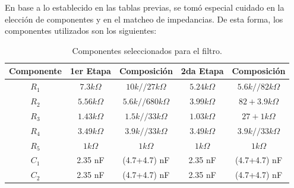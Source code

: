 En base a lo establecido en las tablas previas, se tomó especial cuidado en la elección de componentes y en el matcheo de impedancias. De esta forma, los componentes utilizados son los siguientes:
\begin{table}[H]
\centering
\begin{tabular}{ccccc}
\hline
\multicolumn{1}{c}{Componente} & \multicolumn{1}{c}{1er Etapa} & \multicolumn{1}{c}{Composición} & 2da Etapa      & Composición           \\ \hline
$R_1$                          & $7.3 k\Omega$                 & $10k // 27k  \Omega$            & $5.24 k\Omega$ & $5.6k // 82k  \Omega$ \\
$R_2$                          & $5.56 k\Omega$                & $5.6k // 680k  \Omega$          & $3.99 k\Omega$ & $82 + 3.9k  \Omega$   \\
$R_3$                          & $1.43 k\Omega$                & $1.5 k // 33k  \Omega$          & $1.03k\Omega$  & $27 + 1k  \Omega$     \\
$R_4$                          & $3.49 k\Omega$                & $3.9k // 33k  \Omega$           & $3.49 k\Omega$ & $3.9k // 33k  \Omega$ \\
$R_5$                          & $1 k\Omega$                   & $1 k  \Omega$                   & $1 k\Omega$    & $1 k\Omega$           \\
$C_1$                          & 2.35 nF         & (4.7+4.7) nF                          & 2.35 nF         & (4.7+4.7) nF                \\
$C_2$                          & 2.35 nF         & (4.7+4.7) nF                          & 2.35 nF         & (4.7+4.7) nF               \\
\hline
\end{tabular}
\caption{Componentes seleccionados para el filtro.}
\end{table}

